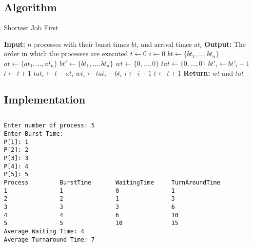 \subsection{Algorithm}

\begin{algorithm}
	\caption{Shortest Job First}
	\label{alg:sjf}
	\begin{algorithmic}[1]
		\State \textbf{Input:} $n$ processes with their burst times $bt_i$ and arrival times $at_i$
		\State \textbf{Output:} The order in which the processes are executed
		\State $t \gets 0$ 
		\State $i \gets 0$ 
		\State $bt \gets \{bt_1, \dots, bt_n\}$ 
		\State $at \gets \{at_1, \dots, at_n\}$ 
		\State $bt' \gets \{bt_1, \dots, bt_n\}$ 
		\State $wt \gets \{0, \dots, 0\}$ 
		\State $tat \gets \{0, \dots, 0\}$ 
			 
				\State $bt'_i \gets bt'_i - 1$
				\State $t \gets t + 1$
					\State $tat_i \gets t - at_i$
					\State $wt_i \gets tat_i - bt_i$
					\State $i \gets i + 1$
				\EndIf
			\Else
				\State $t \gets t + 1$
			\EndIf
		\EndWhile
		\State \textbf{Return:} $wt$ and $tat$
	\end{algorithmic}
\end{algorithm}

\subsection{Implementation}

\inputminted[fontsize=\footnotesize,linenos,autogobble]{c}{code/sjf.c}

\begin{lstlisting}[style=output]
Enter number of process: 5
Enter Burst Time:
P[1]: 1
P[2]: 2
P[3]: 3
P[4]: 4
P[5]: 5
Process         BurstTime       WaitingTime     TurnAroundTime
1               1               0               1
2               2               1               3
3               3               3               6
4               4               6               10
5               5               10              15
Average Waiting Time: 4
Average Turnaround Time: 7
\end{lstlisting}